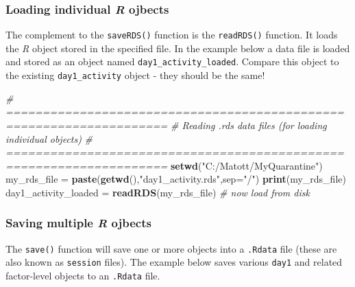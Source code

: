 \documentclass[
]{book}
\newenvironment{Shaded}{\begin{snugshade}}{\end{snugshade}}
\newcommand{\CommentTok}[1]{\textcolor[rgb]{0.56,0.35,0.01}{\textit{#1}}}
\newcommand{\DataTypeTok}[1]{\textcolor[rgb]{0.13,0.29,0.53}{#1}}
\newcommand{\KeywordTok}[1]{\textcolor[rgb]{0.13,0.29,0.53}{\textbf{#1}}}
\newcommand{\NormalTok}[1]{#1}
\newcommand{\StringTok}[1]{\textcolor[rgb]{0.31,0.60,0.02}{#1}}
\begin{document}
\hypertarget{loading-individual-r-ojbects}{%
\subsubsection*{\texorpdfstring{Loading individual \emph{R} ojbects}{Loading individual R ojbects}}\label{loading-individual-r-ojbects}}

The complement to the \texttt{saveRDS()} function is the \texttt{readRDS()} function. It loads the \emph{R} object stored in the specified file. In the example below a data file is loaded and stored as an object named \texttt{day1\_activity\_loaded}. Compare this object to the existing \texttt{day1\_activity} object - they should be the same!

\begin{Shaded}
\begin{Highlighting}[]
\CommentTok{# ====================================================================}
\CommentTok{# Reading .rds data files (for loading individual objects)}
\CommentTok{# ====================================================================}
\KeywordTok{setwd}\NormalTok{(}\StringTok{"C:/Matott/MyQuarantine"}\NormalTok{)}
\NormalTok{my_rds_file =}\StringTok{ }\KeywordTok{paste}\NormalTok{(}\KeywordTok{getwd}\NormalTok{(),}\StringTok{"day1_activity.rds"}\NormalTok{,}\DataTypeTok{sep=}\StringTok{"/"}\NormalTok{)}
\KeywordTok{print}\NormalTok{(my_rds_file)}
\NormalTok{day1_activity_loaded =}\StringTok{ }\KeywordTok{readRDS}\NormalTok{(my_rds_file) }\CommentTok{# now load from disk}
\end{Highlighting}
\end{Shaded}

\hypertarget{saving-multiple-r-ojbects}{%
\subsubsection*{\texorpdfstring{Saving multiple \emph{R} ojbects}{Saving multiple R ojbects}}\label{saving-multiple-r-ojbects}}

The \texttt{save()} function will save one or more objects into a \texttt{.Rdata} file (these are also known as \texttt{session} files). The example below saves various \texttt{day1} and related factor-level objects to an \texttt{.Rdata} file.
\end{document}
